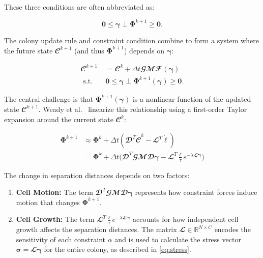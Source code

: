\documentclass[conference]{IEEEtran}
\begin{document}
These three conditions are often abbreviated as:

\begin{equation}
    \mathbf{0} \leq \boldsymbol{\gamma} \perp \mathbf{\Phi}^{k+1} \geq \mathbf{0}.
\end{equation}


The colony update rule and constraint condition combine to form a system where the future state $\mathbfcal{C}^{k+1}$ (and thus $\mathbf{\Phi}^{k+1}$) depends on $\boldsymbol{\gamma}$:

\begin{equation} \label{eq:colony_update_with_constraints}
    \begin{split}
        \mathbfcal{C}^{k+1} & = \mathbfcal{C}^k + \Delta t \mathbfcal{G} \mathbfcal{M} \mathbfcal{F}(\boldsymbol{\gamma})         \\
        \text{ s.t.} \quad  & \mathbf{0} \leq \boldsymbol{\gamma} \perp \mathbf{\Phi}^{k+1}(\boldsymbol{\gamma}) \geq \mathbf{0}.
    \end{split}
\end{equation}

The central challenge is that $\mathbf{\Phi}^{k+1}(\boldsymbol{\gamma})$ is a nonlinear function of the updated state $\mathbfcal{C}^{k+1}$. Weady et al.~\cite{Weady2024} linearize this relationship using a first-order Taylor expansion around the current state $\mathbfcal{C}^k$:

\begin{equation}\label{eq:phi_expanded}
    \begin{split}
        \mathbf{\Phi}^{k+1} & \approx \mathbf{\Phi}^k + \Delta t \left( \mathbfcal{D}^T \dot{\mathbfcal{C}}^k - \mathbfcal{L}^T\dot{\boldsymbol{\ell}} \right)\\
        & = \mathbf{\Phi}^k + \Delta t \Biggl( \mathbfcal{D}^T
        \mathbfcal{G} \mathbfcal{M} \mathbfcal{D} \boldsymbol{\gamma}   - \mathbfcal{L}^T  \frac{\boldsymbol{\ell}} {\tau} e^{-\lambda \mathbfcal{L} \boldsymbol{\gamma } } \Biggr)
    \end{split}
\end{equation}

The change in separation distances depends on two factors:

\begin{enumerate}
    \item \textbf{Cell Motion:} The term $\mathbfcal{D}^T \mathbfcal{G} \mathbfcal{M} \mathbfcal{D} \boldsymbol{\gamma}$ represents how constraint forces induce motion that changes $\mathbf{\Phi}^{k+1}$.
    \item \textbf{Cell Growth:} The term $\mathbfcal{L}^T \frac{\boldsymbol{\ell}}{\tau} e^{-\lambda \mathbfcal{L} \boldsymbol{\gamma}}$ accounts for how independent cell growth affects the separation distances. The matrix $\mathbfcal{L} \in \mathbb{R}^{N \times C}$ encodes the sensitivity of each constraint $\alpha$ and is used to calculate the stress vector $\boldsymbol{\sigma} = \mathbfcal{L} \boldsymbol{\gamma}$ for the entire colony,
          as described in \autoref{eq:stress}.
\end{enumerate}
\end{document}
